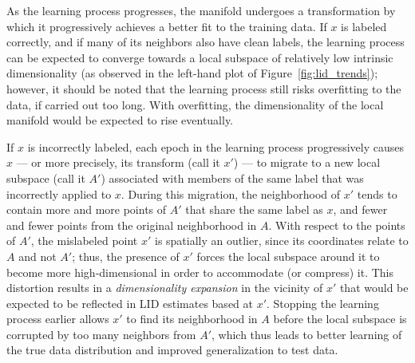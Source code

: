 \documentclass{article}
\begin{document}
As the learning process progresses, the manifold undergoes a transformation by which it progressively achieves a better fit to the training data. If $x$ is labeled correctly, and if many of its neighbors also have clean labels, the learning process can be expected to converge towards a local subspace of relatively low intrinsic dimensionality (as observed in the left-hand plot of Figure~\ref{fig:lid_trends}); however, it should be noted that the learning process still risks overfitting to the data, if carried out too long. With overfitting, the dimensionality of the local manifold would be expected to rise eventually.

If $x$ is incorrectly labeled, each epoch in the learning process progressively causes $x$ --- or more precisely, its transform (call it $x'$) --- to migrate to a new local subspace (call it $A'$) associated with members of the same label that was incorrectly applied to $x$. During this migration, the neighborhood of $x'$ tends to contain more and more points of $A'$ that share the same label as $x$, and fewer and fewer points from the original neighborhood in $A$. With respect to the points of $A'$, the mislabeled point $x'$ is spatially an outlier, since its coordinates relate to $A$ and not $A'$; thus, the presence of $x'$ forces the local subspace around it to become more high-dimensional in order to accommodate (or compress) it. This distortion results in a {\em dimensionality expansion} in the vicinity of $x'$ that would be expected to be reflected in LID estimates based at $x'$. Stopping the learning process earlier allows $x'$ to find its neighborhood in $A$ before the local subspace is corrupted by too many neighbors from $A'$, which thus leads to better learning of the true data distribution and improved generalization to test data.

\end{document}
